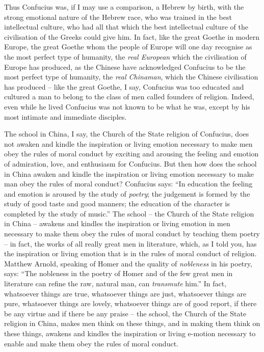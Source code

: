 Thus Confucius was, if I may use a comparison, a Hebrew by birth, with the strong emotional nature of the Hebrew race, who was trained in the best intellectual culture, who had all that which the best intellectual culture of the civilisation of the Greeks could give him.
In fact, like the great Goethe in modern Europe,
the great Goethe whom the people of Europe will one day recognise as the most perfect type of humanity,
the \emph{real European} which the civilisation of Europe has produced,
as the Chinese have acknowledged Confucius to be the most perfect type of humanity,
the \emph{real Chinaman}, which the Chinese civilisation has produced
-- like the great Goethe, I say, Confucius was too educated and cultured a man to belong to the class of men called founders of religion.
Indeed, even while he lived Confucius was not known to be what he was, except by his most intimate and immediate disciples.

The school in China, I say, the Church of the State religion of Confucius, does not awaken and kindle the inspiration or living emotion necessary to make men obey the rules of moral conduct by exciting and arousing the feeling and emotion of admiration, love, and enthusiasm for Confucius.
But then how does the school in China awaken and kindle the inspiration or living emotion necessary to make man obey the rules of moral conduct?
Confucius says: ``In education the feeling and emotion is aroused by the study of \emph{poetry};
the judgement is formed by the study of good taste and good manners;
the education of the character is completed by the study of music.''
The school --  the Church of the State religion in China -- awakens and kindles the inspiration or living emotion in men necessary to make them obey the rules of moral conduct by teaching them poetry -- in fact, the works of all really great men in literature, which, as I told you, has the inspiration or living emotion that is in the rules of moral conduct of religion.
Matthew Arnold, speaking of Homer and the quality of \emph{nobleness} in his poetry, says:
``The nobleness in the poetry of Homer and of the few great men in literature can refine the raw, natural man, can \emph{transmute} him.''
In fact, whatsoever things are true, whatsoever things are just,
whatsoever things are pure, whatsoever things are lovely,
whatsoever things are of good report,
if there be any virtue and if there be any praise
-- the school, the Church of the State religion in China,
makes men think on these things, and in making them think on these things,
awakens and kindles the inspiration or living e-motion necessary
to enable and make them obey the rules of moral conduct.

